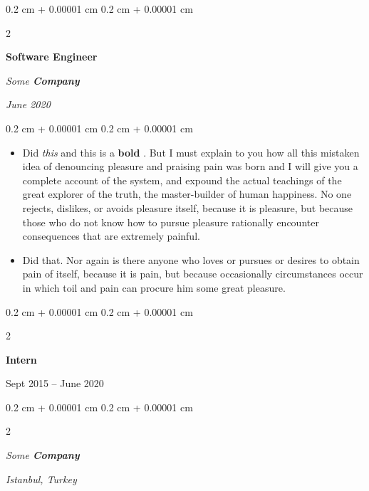 \documentclass[10pt, letterpaper]{article}
\newenvironment{highlights}{
    \begin{itemize}[
        topsep=0.10 cm,
        parsep=0.10 cm,
        partopsep=0pt,
        itemsep=0pt,
        leftmargin=0.4 cm + 10pt
    ]
}{
    \end{itemize}
} %
\newenvironment{onecolentry}{
    \begin{adjustwidth}{
        0.2 cm + 0.00001 cm
    }{
        0.2 cm + 0.00001 cm
    }
}{
    \end{adjustwidth}
} %
\newenvironment{twocolentry}[2][]{
    \onecolentry
    \def\secondColumn{#2}
    \setcolumnwidth{\fill, 4.5 cm}
    \begin{paracol}{2}
}{
    \switchcolumn \raggedleft \secondColumn
    \end{paracol}
    \endonecolentry
} %
\let\hrefWithoutArrow\href
\renewcommand{\href}[2]{\hrefWithoutArrow{#1}{\ifthenelse{\equal{#2}{}}{ }{#2 }\raisebox{.15ex}{\footnotesize \faExternalLink*}}}
\begin{document}
        \vspace{0.2 cm}

            \begin{twocolentry}{


        \textit{June 2020}    }
                \textbf{Software Engineer}

                \textit{Some \textbf{Company}}
            \end{twocolentry}

        \vspace{0.10 cm}
        \begin{onecolentry}
            \begin{highlights}
                \item Did \textit{this} and this is a \textbf{bold} \href{https://example.com}{link}. But I must explain to you how all this mistaken idea of denouncing pleasure and praising pain was born and I will give you a complete account of the system, and expound the actual teachings of the great explorer of the truth, the master-builder of human happiness. No one rejects, dislikes, or avoids pleasure itself, because it is pleasure, but because those who do not know how to pursue pleasure rationally encounter consequences that are extremely painful.
                \item Did that. Nor again is there anyone who loves or pursues or desires to obtain pain of itself, because it is pain, but because occasionally circumstances occur in which toil and pain can procure him some great pleasure.
            \end{highlights}
        \end{onecolentry}


        \vspace{0.2 cm}

                \begin{twocolentry}{
                    Sept 2015 – June 2020
                }
                \textbf{Intern}
                \end{twocolentry}
            \begin{twocolentry}{
        \textit{Istanbul, Turkey}    }
            \textit{Some \textbf{Company}}
            \end{twocolentry}
\end{document}
